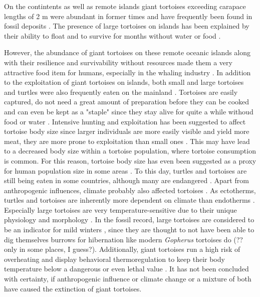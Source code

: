 On the contintents as well as remote islands giant tortoises exceeding carapace lengths of 2 m were abundant in former times and have frequently been found in fossil deposits \citep{.}. The presence of large tortoises on islands has been explained by their ability to float and to survive for months without water or food \citep{Gerlach2006, Patterson1973, Cheke2016}. 


However, the abundance of giant tortoises on these remote oceanic islands along with their resilience and survivability without resources made them a very attractive food item for humans, especially in the whaling industry \citep{.}.
In addition to the exploitation of giant tortoises on islands, both small and large tortoises and turtles were also frequently eaten on the mainland \citep{.}.
Tortoises are easily captured, do not need a great amount of preparation before they can be cooked and can even be kept as a "staple" since they stay alive for quite a while withoud food or water \citep{Thompson2002,Thompson2014}. Intensive hunting and exploitation has been suggested to affect tortoise body size \citep{.} since larger individuals are more easily visible and yield more meat, they are more prone to exploitation than small ones \citep{Rhodin2015}. This may have lead to a decreased body size within a tortoise population, where tortoise consumption is common.
For this reason, tortoise body size has even been suggested as a proxy for human population size in some areas \citep{Steele2005,Stiner1999,Stiner2000}.
To this day, turtles and tortoises are still being eaten in some countries, although many are endangered \citep{.}.
Apart from anthropogenic influences, climate probably also affected tortoises \citep{.}. 
As ectotherms, turtles and tortoises are inherently more dependent on climate than endotherms \citep{.}. Especially large tortoises are very temperature-sensitive due to their unique physiology and morphology \citep{Swingland1979a, Swingland1979b}. In the fossil record, large tortoises are considered to be an indicator for mild winters \citep{Hibbard1960,Schleich1981}, since they are thought to not have been able to dig themselves burrows for hibernation like modern \textit{Gopherus} tortoises do (?? only in some places, I guess?)\citep{Carlson1999, Stojanov2009}. Additionally, giant tortoises run a high risk of overheating and display behavioral thermoregulation to keep their body temperature below a dangerous or even lethal value \citep{Sturbaum1982, Schleich1981}.
It has not been concluded with certainty, if anthropogenic influence or climate change or a mixture of both have caused the extinction of giant tortoises\citep{Rhodin2015}.


